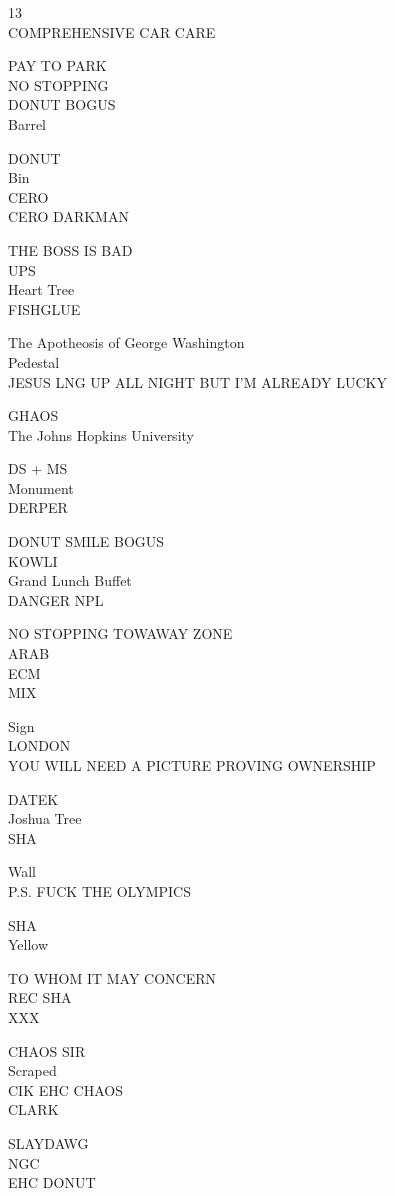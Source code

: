 \documentclass[10pt,letterpaper]{article}
\begin{document}
13\\
COMPREHENSIVE CAR CARE

PAY TO PARK\\
NO STOPPING\\
DONUT BOGUS\\
Barrel

DONUT\\
Bin\\
CERO\\
CERO DARKMAN

THE BOSS IS BAD\\
UPS\\
Heart Tree\\
FISHGLUE

The Apotheosis of George Washington\\
Pedestal\\
JESUS LNG UP ALL NIGHT BUT I'M ALREADY LUCKY

GHAOS\\
The Johns Hopkins University

DS + MS\\
Monument\\
DERPER

DONUT SMILE BOGUS\\
KOWLI\\
Grand Lunch Buffet\\
DANGER NPL

NO STOPPING TOWAWAY ZONE\\
ARAB\\
ECM\\
MIX

Sign\\
LONDON\\
YOU WILL NEED A PICTURE PROVING OWNERSHIP

DATEK\\
Joshua Tree\\
SHA

Wall\\
P.S. FUCK THE OLYMPICS

SHA\\
Yellow

TO WHOM IT MAY CONCERN\\
REC SHA\\
XXX

CHAOS SIR\\
Scraped\\
CIK EHC CHAOS\\
CLARK

SLAYDAWG\\
NGC\\
EHC DONUT
\end{document}
